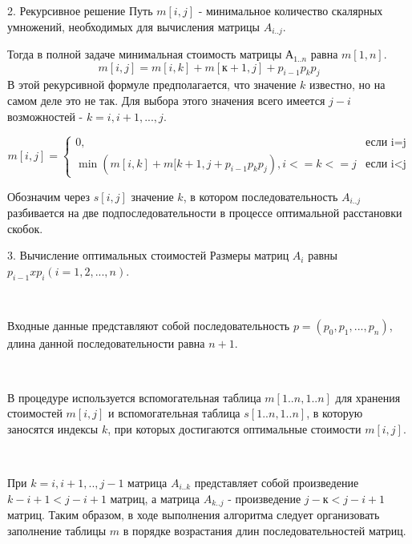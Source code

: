 \documentclass{beamer}
\begin{document}
\begin{frame}[t]{2. Рекурсивное решение}
    Путь $m[i,j]$  - минимальное количество скалярных умножений, необходимых для вычисления матрицы $A_{i..j}$. 
    
    Тогда в полной задаче минимальная стоимость матрицы $А_{1..n}$ равна $m[1,n]$.
    \[
    m[i,j] = m[i,k] + m[к+1,j] + p_{i-1}p_kp_j
    \]
    В этой рекурсивной формуле предполагается, что значение $k$ известно, но на самом деле это не так. Для выбора этого значения всего имеется $j-i$ возможностей - $k=i,i+1,...,j$.
    
    \begin{equation*}
            m[i,j] = 
            \begin{cases}
                0, &\text{если i=j}\\
                \min(m[i,k]+m[k+1,j+p_{i-1}p_kp_j), i<=k<=j &\text{если i<j}
            \end{cases}
    \end{equation*}
    
    Обозначим через $s[i,j]$ значение $k$, в котором последовательность $A_{i..j}$ разбивается на две подпоследовательности в процессе оптимальной расстановки скобок.
\end{frame}

\begin{frame}[t]{3. Вычисление оптимальных стоимостей}
    Размеры матриц $A_i$ равны $p_{i-1} x p_i (i=1, 2,..., n)$. 
    
    ~
    
    Входные данные представляют собой последовательность 
    $p = (p_0, p_1,..., p_n)$, длина данной последовательности равна $n+1$. 
    
    ~
    
    В процедуре используется вспомогательная таблица $m[1..n,1..n]$ для хранения стоимостей $m[i, j]$ и вспомогательная таблица $s[1..n,1..n]$, в которую заносятся индексы $k$, при которых достигаются оптимальные стоимости $m[i,j]$.
    
    ~
    
    При $k=i,i+1,..,j-1$ матрица $A_{i..k}$ представляет собой произведение $k-i+1<j-i+1$ матриц, а матрица $A_{k..j}$ - произведение $j-к<j-i+1$ матриц. Таким образом, в ходе выполнения алгоритма следует организовать заполнение таблицы $m$ в порядке возрастания длин последовательностей матриц. 
\end{frame}
\end{document}
